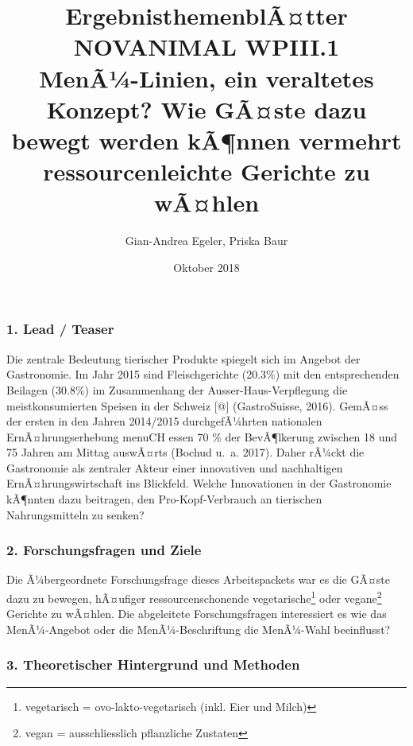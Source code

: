 \documentclass[12pt,ngerman,]{article}
\title{ErgebnisthemenblÃ¤tter NOVANIMAL WPIII.1\\
MenÃ¼-Linien, ein veraltetes Konzept? Wie GÃ¤ste dazu bewegt werden
kÃ¶nnen vermehrt ressourcenleichte Gerichte zu wÃ¤hlen}
\author{Gian-Andrea Egeler, Priska Baur}
\date{Oktober 2018}
\let\rmarkdownfootnote\footnote%
\def\footnote{\protect\rmarkdownfootnote}
\begin{document}
\maketitle

\hypertarget{lead-teaser}{%
\subsubsection{1. Lead / Teaser}\label{lead-teaser}}

Die zentrale Bedeutung tierischer Produkte spiegelt sich im Angebot der
Gastronomie. Im Jahr 2015 sind Fleischgerichte (20.3\%) mit den
entsprechenden Beilagen (30.8\%) im Zusammenhang der
Ausser-Haus-Verpflegung die meistkonsumierten Speisen in der Schweiz
{[}@{]} (GastroSuisse, 2016). GemÃ¤ss der ersten in den Jahren 2014/2015
durchgefÃ¼hrten nationalen ErnÃ¤hrungserhebung menuCH essen 70 \% der
BevÃ¶lkerung zwischen 18 und 75 Jahren am Mittag auswÃ¤rts (Bochud u.~a.
2017). Daher rÃ¼ckt die Gastronomie als zentraler Akteur einer
innovativen und nachhaltigen ErnÃ¤hrungswirtschaft ins Blickfeld. Welche
Innovationen in der Gastronomie kÃ¶nnten dazu beitragen, den
Pro-Kopf-Verbrauch an tierischen Nahrungsmitteln zu senken?

\hypertarget{forschungsfragen-und-ziele}{%
\subsubsection{2. Forschungsfragen und
Ziele}\label{forschungsfragen-und-ziele}}

Die Ã¼bergeordnete Forschungsfrage dieses Arbeitspackets war es die
GÃ¤ste dazu zu bewegen, hÃ¤ufiger ressourcenschonende
vegetarische\footnote{vegetarisch = ovo-lakto-vegetarisch (inkl. Eier
  und Milch)} oder vegane\footnote{vegan = ausschliesslich pflanzliche
  Zustaten} Gerichte zu wÃ¤hlen. Die abgeleitete Forschungsfragen
interessiert es wie das MenÃ¼-Angebot oder die MenÃ¼-Beschriftung die
MenÃ¼-Wahl beeinflusst?

\hypertarget{theoretischer-hintergrund-und-methoden}{%
\subsubsection{3. Theoretischer Hintergrund und
Methoden}\label{theoretischer-hintergrund-und-methoden}}
\end{document}
